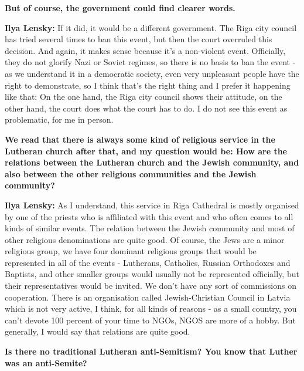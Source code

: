 \textbf{But of course, the government could find clearer words.} 

\textbf{Ilya Lensky:} If it did, it would be a different government. The Riga city council  has tried several times to ban this event, but then the court overruled this decision. And again, it makes sense because it’s a non-violent event. Officially, they do not glorify Nazi or Soviet regimes, so there is no basis to ban the event - as we understand it in a democratic society, even very unpleasant people have the right to demonstrate, so I think that’s the right thing and I prefer it happening like that: On the one hand, the Riga city council shows their attitude, on the other hand, the court does what the court has to do. I do not see this event as problematic, for me in person.

\textbf{We read that there is always some kind of religious service in the Lutheran church after that, and my question would be: How are the relations between the Lutheran church and the Jewish community, and also between the other religious communities and the Jewish community?}

\textbf{Ilya Lensky:} As I understand, this service in Riga Cathedral is mostly organised by one of the priests who is affiliated with this event and who often comes to all kinds of similar events. The relation between the Jewish community and most of other religious denominations are quite good. Of course, the Jews are a minor religious group, we have four dominant religious groups that would be represented in all of the events - Lutherans, Catholics, Russian Orthodoxes and Baptists, and other smaller groups would usually not be represented officially, but their representatives would be invited. We don’t have any sort of commissions on cooperation. There is an organisation called Jewish-Christian Council in Latvia which is not very active, I think, for all kinds of reasons - as a small country, you can’t devote 100 percent of your time to NGOs, NGOS are more of a hobby. But generally, I would say that relations are quite good. 

\textbf{Is there no traditional Lutheran anti-Semitism? You know that Luther was an anti-Semite?} 

